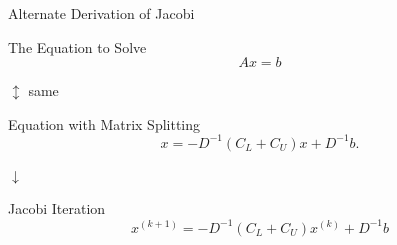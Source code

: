 \documentclass[10pt]{beamer}
\begin{document}
\begin{frame}{Alternate Derivation of Jacobi}
    \begin{block}{The Equation to Solve}
        $$Ax = b$$
    \end{block}
\begin{center} 
$\updownarrow$ same 
\end{center} \vspace{-2mm}
\begin{block}{Equation with Matrix Splitting}
\[
    x=-D^{-1}(C_L+C_U)x+D^{-1}b.
\]
\end{block}
\begin{center} 
$\downarrow$ 
\end{center}\vspace{-2mm}
\begin{block}{Jacobi Iteration}
$$ x^{(k+1)} =   -D^{-1}(C_L + C_U)x^{(k)} + D^{-1}b$$
\end{block}
\end{frame}

\end{document}
